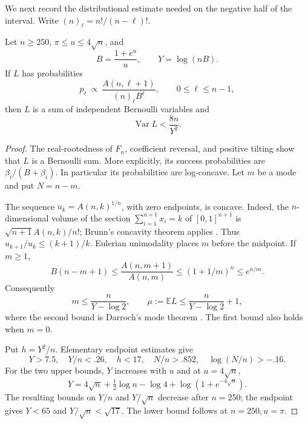 We next record the distributional estimate needed on the negative
half of the interval. Write $(n)_\ell=n!/(n-\ell)!$.

\begin{lemma}\label{lem:variance}
Let $n\ge250$, $\pi\le u\le4\sqrt n$, and
\[
 B=\frac{1+e^u}{u},\qquad Y=\log(nB).
\]
If $L$ has probabilities
\[
 p_\ell\ \propto\ \frac{A(n,\ell+1)}{(n)_\ell B^\ell},
 \qquad 0\le\ell\le n-1,
\]
then $L$ is a sum of independent Bernoulli variables and
\[
 \operatorname{Var}L<\frac{8n}{Y^2}.
\]
\end{lemma}
\begin{proof}
The real-rootedness of $F_n$, coefficient reversal, and positive
tilting show that $L$ is a Bernoulli sum. More explicitly, its success
probabilities are $\beta_i/(B+\beta_i)$. In particular its probabilities
are log-concave. Let $m$ be a mode and put $N=n-m$.

The sequence $u_k=A(n,k)^{1/n}$, with zero endpoints, is concave.
Indeed, the $n$-dimensional volume of the section
$\sum_{i=1}^{n+1}x_i=k$ of $[0,1]^{n+1}$ is
$\sqrt{n+1}A(n,k)/n!$; Brunn's concavity theorem applies
\cite{Gardner2002}. Thus $u_{k+1}/u_k\le(k+1)/k$.
Eulerian unimodality places $m$ before the midpoint. If $m\ge1$,
\[
 B(n-m+1)\le\frac{A(n,m+1)}{A(n,m)}
 \le(1+1/m)^n\le e^{n/m}.
\]
Consequently
\begin{equation}\label{eq:bulk-mode-mean}
 m\le\frac n{Y-\log2},\qquad
 \mu:=\mathbb EL\le\frac n{Y-\log2}+1,
\end{equation}
where the second bound is Darroch's mode theorem
\cite{Darroch1964}. The first bound also holds when $m=0$.

Put $h=Y^2/n$. Elementary endpoint estimates give
\begin{equation}\label{eq:variance-parameters}
 Y>7.5,\quad Y/n<.26,\quad h<17,\quad
 N/n>.852,\quad\log(N/n)>-.16.
\end{equation}
For the two upper bounds, $Y$ increases with $u$ and at $u=4\sqrt n$,
\[
 Y=4\sqrt n+\tfrac12\log n-\log4+
       \log(1+e^{-4\sqrt n}).
\]
The resulting bounds on $Y/n$ and $Y/\sqrt n$ decrease after $n=250$;
the endpoint gives $Y<65$ and $Y/\sqrt n<\sqrt{17}$.
The lower bound follows at $n=250,u=\pi$.


\end{proof}
